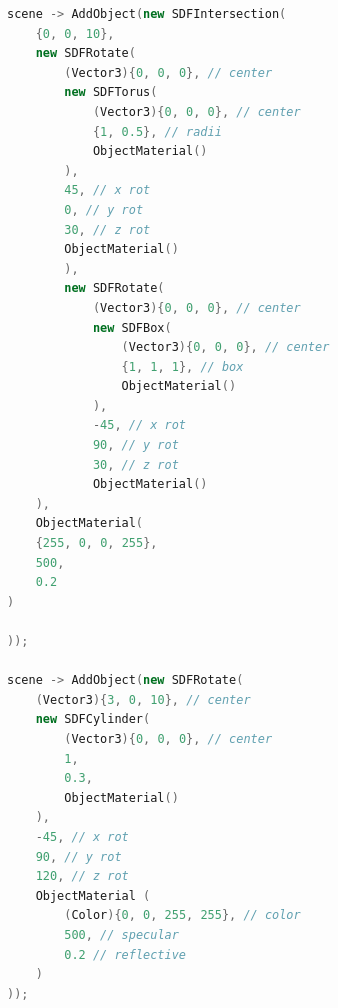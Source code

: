 \documentclass[12pt, a4paper]{article}
\begin{document}
\begin{lstlisting}[language=C++]
scene -> AddObject(new SDFIntersection(
	{0, 0, 10},
	new SDFRotate(
		(Vector3){0, 0, 0}, // center
		new SDFTorus(
			(Vector3){0, 0, 0}, // center
			{1, 0.5}, // radii
			ObjectMaterial()
		),
		45, // x rot
		0, // y rot
		30, // z rot
		ObjectMaterial()
		),
		new SDFRotate(      
			(Vector3){0, 0, 0}, // center
			new SDFBox(
				(Vector3){0, 0, 0}, // center
				{1, 1, 1}, // box
				ObjectMaterial()
			),
			-45, // x rot
			90, // y rot
			30, // z rot
			ObjectMaterial()
	),
	ObjectMaterial(
	{255, 0, 0, 255},
	500,
	0.2
)

));

scene -> AddObject(new SDFRotate(
	(Vector3){3, 0, 10}, // center
	new SDFCylinder(
		(Vector3){0, 0, 0}, // center
		1,
		0.3,
		ObjectMaterial()
	),
	-45, // x rot
	90, // y rot
	120, // z rot
	ObjectMaterial (
		(Color){0, 0, 255, 255}, // color
		500, // specular
		0.2 // reflective
	)
));
\end{lstlisting}

\clearpage
\end{document}
